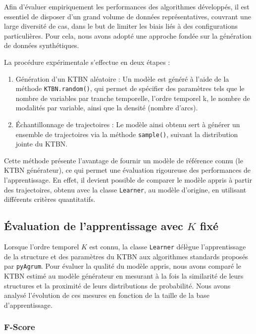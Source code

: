\documentclass{article}
\begin{document}
Afin d'évaluer empiriquement les performances des algorithmes développés, il est essentiel de disposer d'un grand
volume de données représentatives, couvrant une large diversité de cas, dans le but de limiter les biais liés à
des configurations particulières. Pour cela, nous avons adopté une approche fondée sur la génération de données synthétiques.

La procédure expérimentale s'effectue en deux étapes :

\begin{enumerate}
    \item Génération d'un KTBN aléatoire : Un modèle est généré à l'aide de la méthode \texttt{KTBN.random()}, qui
          permet de spécifier des paramètres tels que le nombre de variables par tranche temporelle, l'ordre temporel k,
          le nombre de modalités par variable, ainsi que la densité (nombre d'arcs).
    \item Échantillonnage de trajectoires : Le modèle ainsi obtenu sert à générer un ensemble de trajectoires via
          la méthode \texttt{sample()}, suivant la distribution jointe du KTBN.
\end{enumerate}

Cette méthode présente l'avantage de fournir un modèle de référence connu (le KTBN générateur), ce qui permet une
évaluation rigoureuse des performances de l'apprentissage. En effet, il devient possible de comparer le modèle appris
à partir des trajectoires, obtenu avec la classe \texttt{Learner}, au modèle d'origine, en utilisant différents
critères quantitatifs.


\subsection{Évaluation de l'apprentissage avec $K$ fixé}

Lorsque l'ordre temporel $K$ est connu, la classe \texttt{Learner} délègue l'apprentissage de la structure et des
paramètres du KTBN aux algorithmes standards proposés par \texttt{pyAgrum}. Pour évaluer la qualité du modèle appris,
nous avons comparé le KTBN estimé au modèle générateur en mesurant à la fois la similarité de leurs structures et
la proximité de leurs distributions de probabilité. Nous avons analysé l'évolution de ces mesures en fonction de la
taille de la base d'apprentissage.

\subsubsection{F-Score}
\end{document}
